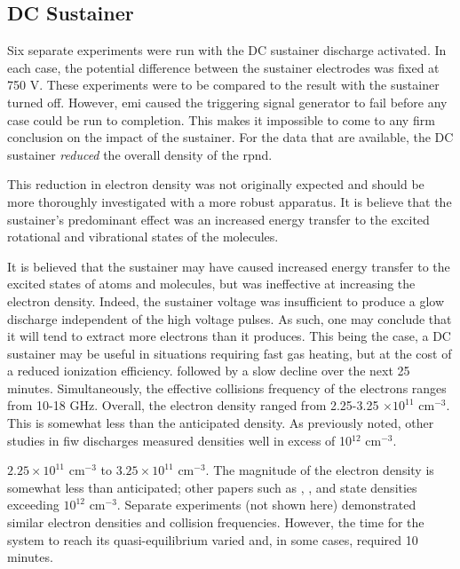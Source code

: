 \subsection{DC Sustainer}

Six separate experiments were run with the DC sustainer discharge activated. In
each case, the potential difference between the sustainer electrodes was fixed
at 750 V. These experiments were to be compared to the result with the sustainer
turned off. However, \acs{emi} caused the triggering signal generator to fail
before any case could be run to completion. This makes it impossible to come to
any firm conclusion on the impact of the sustainer. For the data that are
available, the DC sustainer \emph{reduced} the overall density of the
\acs{rpnd}.

This reduction in electron density was not originally expected and should be
more thoroughly investigated with a more robust apparatus. It is believe that
the sustainer's predominant effect was an increased energy transfer to the
excited rotational and vibrational states of the molecules.

It is believed that the sustainer may have caused increased energy transfer to
the excited states of atoms and molecules, but was ineffective at increasing the
electron density. Indeed, the sustainer voltage was insufficient to produce a
glow discharge independent of the high voltage pulses. As such, one may conclude
that it will tend to extract more electrons than it produces. This being the
case, a DC sustainer may be useful in situations requiring fast gas heating, but
at the cost of a reduced ionization efficiency. followed by a slow decline over
the next 25 minutes. Simultaneously, the effective collisions frequency of the
electrons ranges from 10-18 GHz. Overall, the electron density ranged from
2.25-3.25 $\times10^{11}$ cm$^{-3}$. This is somewhat less than the anticipated
density. As previously noted, other studies in \acs{fiw} discharges
\cite{Aleksandrov2007, Pancheshnyi1999, Macheret2006} measured densities well in
excess of 10$^{12}$ cm$^{-3}$.

$2.25\times 10^{11}$ cm$^{-3}$ to $3.25\times 10^{11}$ cm$^{-3}$. The magnitude
of the electron density is somewhat less than anticipated; other papers such as
\cite{Aleksandrov2007}, \cite{Pancheshnyi1999}, and \cite{Macheret2006} state
densities exceeding $10^{12}$ cm$^{-3}$. Separate experiments (not shown here)
demonstrated similar electron densities and collision frequencies. However, the
time for the system to reach its quasi-equilibrium varied and, in some cases,
required 10 minutes.

